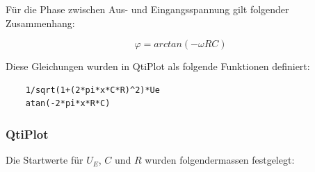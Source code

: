 F\"ur   die  Phase   zwischen   Aus-  und   Eingangsspannung  gilt   folgender
Zusammenhang:

\begin{equation}
    \varphi = arctan(-\omega R C)
    \label{eq:rc:phi}
\end{equation}

Diese Gleichungen wurden in QtiPlot als folgende Funktionen definiert:

\begin{verbatim}
    1/sqrt(1+(2*pi*x*C*R)^2)*Ue
    atan(-2*pi*x*R*C)
\end{verbatim}


\subsubsection{QtiPlot}
\label{subsubsec:rcglied:startwerte}

Die Startwerte f\"ur $U_E$, $C$ und $R$ wurden folgendermassen festgelegt:

